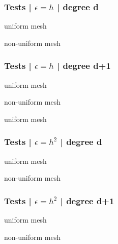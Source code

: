 \documentclass[10pt,fleqn]{beamer}
\begin{document}
\begin{frame}
\frametitle{Tests | $\epsilon=h$ | degree d}

\begin{minipage}[b]{0.49\textwidth}
\small
\centering 
uniform mesh

\end{minipage}
\begin{minipage}[b]{0.49\textwidth}
\small
\centering 
non-uniform mesh

\end{minipage}
\end{frame}

\begin{frame}
\frametitle{Tests | $\epsilon=h$ | degree d+1}

\begin{minipage}[b]{0.315\textwidth}
\small
\centering 
uniform mesh

\end{minipage}
\begin{minipage}[b]{0.315\textwidth}
\small
\centering 
non-uniform mesh

\end{minipage}
\begin{minipage}[b]{0.315\textwidth}
\small
\centering 
uniform mesh

\end{minipage}
\end{frame}

\begin{frame}
\frametitle{Tests | $\epsilon=h^2$ | degree d}

\begin{minipage}[b]{0.49\textwidth}
\small
\centering 
uniform mesh

\end{minipage}
\begin{minipage}[b]{0.49\textwidth}
\small
\centering 
non-uniform mesh

\end{minipage}
\end{frame}


\begin{frame}
\frametitle{Tests | $\epsilon=h^2$ | degree d+1}

\begin{minipage}[b]{0.49\textwidth}
\small
\centering 
uniform mesh

\end{minipage}
\begin{minipage}[b]{0.49\textwidth}
\small
\centering 
non-uniform mesh

\end{minipage}
\end{frame}


\end{document}
